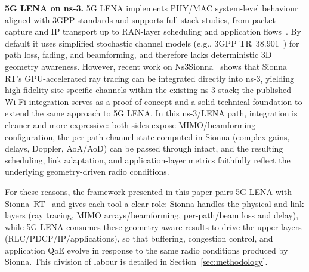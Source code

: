 \textbf{5G LENA on ns-3.} 5G LENA implements PHY/MAC system-level behaviour
aligned with 3GPP standards and supports full-stack studies, from packet
capture and IP transport up to RAN-layer scheduling and application
flows~\cite{ref:5glena}. By default it uses simplified stochastic channel
models (e.g., 3GPP TR~38.901~\cite{ref:tr38901}) for path loss, fading, and
beamforming, and therefore lacks deterministic 3D geometry awareness. However,
recent work on Ns3Sionna~\cite{ref:ns3sionna} shows that Sionna RT's
GPU-accelerated ray tracing can be integrated directly into ns-3, yielding
high-fidelity site-specific channels within the existing ns-3 stack; the
published Wi-Fi integration serves as a proof of concept and a solid
technical foundation to extend the same approach to 5G LENA. In this
ns-3/LENA path, integration is cleaner and more expressive: both sides expose
MIMO/beamforming configuration, the per-path channel state computed in Sionna
(complex gains, delays, Doppler, AoA/AoD) can be passed through intact, and
the resulting scheduling, link adaptation, and application-layer metrics
faithfully reflect the underlying geometry-driven radio conditions.

For these reasons, the framework presented in this paper pairs 5G LENA with
Sionna~RT~\cite{ref:sionna_rt} and gives each tool a clear role: Sionna
handles the physical and link layers (ray tracing, MIMO arrays/beamforming,
per-path/beam loss and delay), while 5G LENA consumes these geometry-aware
results to drive the upper layers (RLC/PDCP/IP/applications), so that
buffering, congestion control, and application QoE evolve in response to the
same radio conditions produced by Sionna. This division of labour is detailed
in Section~\ref{sec:methodology}.
